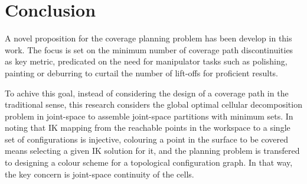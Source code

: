 \documentclass[journal]{IEEEtran}
\begin{document}
\section{Conclusion}
\label{sectionconclusion}

A novel proposition for the coverage planning problem has been develop in this work. The focus is set on the minimum
number of coverage path discontinuities as key metric, predicated on the need for manipulator tasks such as polishing, painting or 
deburring to curtail the number of lift-offs for proficient results.

To achive this goal, instead of considering the design of a coverage path in the traditional sense, this research considers the global optimal cellular decomposition problem in joint-space to assemble joint-space partitions with minimum sets. 
In noting that IK mapping from the reachable points in the workspace to a single set of configurations is injective, 
colouring a point in the surface to be covered means selecting a given IK solution for it, and the planning problem is transfered to designing a colour scheme for a topological configuration graph. In that way, the key concern is joint-space continuity of the cells. 
\end{document}
